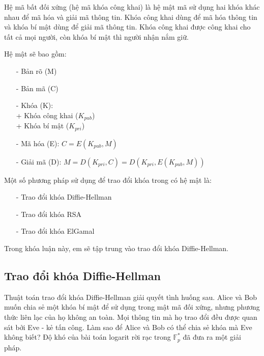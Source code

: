 Hệ mã bất đối xứng (hệ mã khóa công khai) là hệ mật mã sử dụng hai khóa khác nhau để mã hóa và giải mã thông tin.
Khóa công khai dùng để mã hóa thông tin và khóa bí mật dùng để giải mã thông tin. Khóa công khai được công khai 
cho tất cả mọi người, còn khóa bí mật thì người nhận nắm giữ.


Hệ mật sẽ bao gồm:
\begin{itemize}
    \item[-] Bản rõ (M)
    \item[-] Bản mã (C)
    \item[-] Khóa (K): 
        \\+ Khóa công khai ($K_{pub}$)
        \\+ Khóa bí mật ($K_{pri}$) 
    \item[-] Mã hóa (E): $C = E(K_{pub},M)$
    \item[-] Giải mã (D): $M = D(K_{pri},C) = D(K_{pri},E(K_{pub},M))$
\end{itemize}

Một số phương pháp sử dụng để trao đổi khóa trong có hệ mật là:
\begin{itemize}
    \item[-] Trao đổi khóa Diffie-Hellman
    \item[-] Trao đổi khóa RSA
    \item[-] Trao đổi khóa ElGamal
\end{itemize}

Trong khóa luận này, em sẽ tập trung vào trao đổi khóa Diffie-Hellman.
\subsection{Trao đổi khóa Diffie-Hellman}

Thuật toán trao đổi khóa Diffie-Hellman giải quyết tình huống sau. Alice và
Bob muốn chia sẻ một khóa bí mật để sử dụng trong mật mã đối xứng, nhưng
phương thức liên lạc của họ không an toàn. Mọi thông tin mà họ trao
đổi đều được quan sát bởi Eve - kẻ tấn công. Làm sao để Alice và Bob có
thể chia sẻ khóa mà Eve không biết? Độ khó của bài toán logarit rời
rạc trong $\mathbb{F}^*_p$ đã đưa ra một giải pháp.


